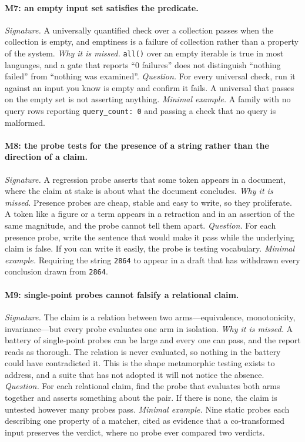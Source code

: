\documentclass[11pt]{article}
\begin{document}
\paragraph{M7: an empty input set satisfies the predicate.}
\emph{Signature.} A universally quantified check over a collection passes when the collection is empty, and emptiness is a failure of collection rather than a property of the system.
\emph{Why it is missed.} \texttt{all()} over an empty iterable is true in most languages, and a gate that reports ``0 failures'' does not distinguish ``nothing failed'' from ``nothing was examined''.
\emph{Question.} For every universal check, run it against an input you know is empty and confirm it fails. A universal that passes on the empty set is not asserting anything.
\emph{Minimal example.} A family with no query rows reporting \texttt{query\_count: 0} and passing a check that no query is malformed.

\paragraph{M8: the probe tests for the presence of a string rather than the direction of a claim.}
\emph{Signature.} A regression probe asserts that some token appears in a document, where the claim at stake is about what the document concludes.
\emph{Why it is missed.} Presence probes are cheap, stable and easy to write, so they proliferate. A token like a figure or a term appears in a retraction and in an assertion of the same magnitude, and the probe cannot tell them apart.
\emph{Question.} For each presence probe, write the sentence that would make it pass while the underlying claim is false. If you can write it easily, the probe is testing vocabulary.
\emph{Minimal example.} Requiring the string \texttt{2864} to appear in a draft that has withdrawn every conclusion drawn from \texttt{2864}.

\paragraph{M9: single-point probes cannot falsify a relational claim.}
\emph{Signature.} The claim is a relation between two arms---equivalence, monotonicity, invariance---but every probe evaluates one arm in isolation.
\emph{Why it is missed.} A battery of single-point probes can be large and every one can pass, and the report reads as thorough. The relation is never evaluated, so nothing in the battery could have contradicted it. This is the shape metamorphic testing exists to address, and a suite that has not adopted it will not notice the absence.
\emph{Question.} For each relational claim, find the probe that evaluates both arms together and asserts something about the pair. If there is none, the claim is untested however many probes pass.
\emph{Minimal example.} Nine static probes each describing one property of a matcher, cited as evidence that a co-transformed input preserves the verdict, where no probe ever compared two verdicts.
\end{document}
